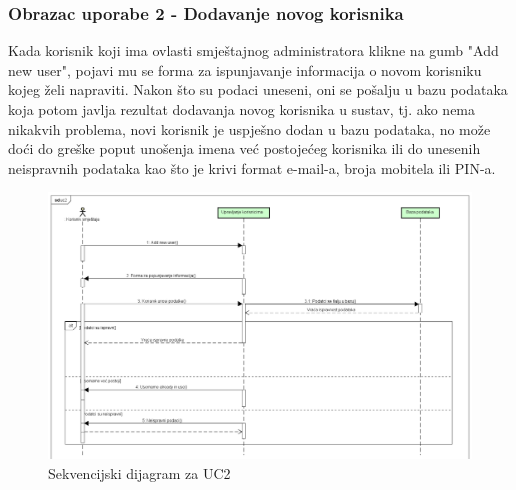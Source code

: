 			\subsubsection{Obrazac uporabe 2 - Dodavanje novog korisnika}
			Kada korisnik koji ima ovlasti smještajnog administratora klikne na gumb "Add new user", pojavi mu se forma za ispunjavanje informacija o novom korisniku kojeg želi napraviti. Nakon što su podaci uneseni, oni se pošalju u bazu podataka koja potom javlja rezultat dodavanja novog korisnika u sustav, tj. ako nema nikakvih problema, novi korisnik je uspješno dodan u bazu podataka, no može doći do greške poput unošenja imena već postojećeg korisnika ili do unesenih neispravnih podataka kao što je krivi format e-mail-a, broja mobitela ili PIN-a.
			\begin{figure}[H]
				\centering
				\includegraphics[width=\textwidth]{slike/uc2(update).png} %
				\caption{Sekvencijski dijagram za UC2}
				\label{fig:Sekvencijski dijagram za UC2}
			\end{figure}
			\eject		
			

